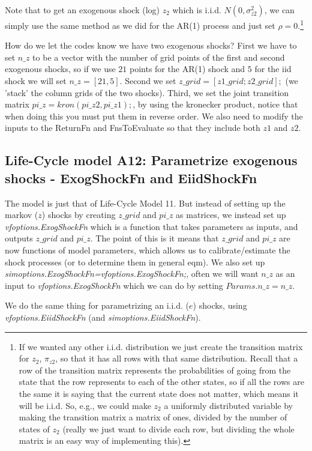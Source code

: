 Note that to get an exogenous shock (log) $z_2$ which is i.i.d. $N(0,\sigma_{z2}^2)$, we can simply use the same method as we did for the AR(1) process and just set $\rho=0$.\footnote{If we wanted any other i.i.d. distribution we just create the transition matrix for $z_2$, $\pi_{z2}$, so that it has all rows with that same distribution. Recall that a row of the transition matrix represents the probabilities of going from the state that the row represents to each of the other states, so if all the rows are the same it is saying that the current state does not matter, which means it will be i.i.d. So, e.g., we could make $z_2$ a uniformly distributed variable by making the transition matrix a matrix of ones, divided by the number of states of $z_2$ (really we just want to divide each row, but dividing the whole matrix is an easy way of implementing this).}

How do we let the codes know we have two exogenous shocks? First we have to set $n\_{}z$ to be a vector with the number of grid points of the first and second exogenous shocks, so if we use $21$ points for the AR(1) shock and $5$ for the iid shock we will set $n\_{}z=[21,5]$. Second we set $z\_{}grid=[z1\_{}grid; z2\_{}grid];$ (we 'stack' the column grids of the two shocks). Third, we set the joint transition matrix $pi\_{}z=kron(pi\_{}z2, pi\_{}z1);$, by using the kronecker product, notice that when doing this you must put them in reverse order. We also need to modify the inputs to the ReturnFn and FnsToEvaluate so that they include both $z1$ and $z2$.

\subsection{Life-Cycle model A12: Parametrize exogenous shocks - ExogShockFn and EiidShockFn}
The model is just that of Life-Cycle Model 11. But instead of setting up the markov ($z$) shocks by creating $z\_{}grid$ and $pi\_{}z$ as matrices, we instead set up \textit{vfoptions.ExogShockFn} which is a function that takes parameters as inputs, and outputs $z\_{}grid$ and $pi\_{}z$. The point of this is it means that $z\_{}grid$ and $pi\_{}z$ are now functions of model parameters, which allows us to calibrate/estimate the shock processes (or to determine them in general eqm). We also set up \textit{simoptions.ExogShockFn=vfoptions.ExogShockFn;}, often we will want $n\_{}z$ as an input to \textit{vfoptions.ExogShockFn} which we can do by setting $Params.n\_{}z=n\_{}z$.

We do the same thing for parametrizing an i.i.d. ($e$) shocks, using \textit{vfoptions.EiidShockFn} (and \textit{simoptions.EiidShockFn}).

